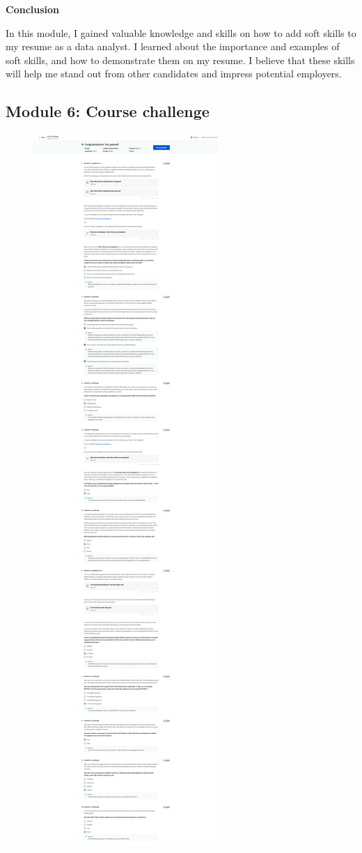 \documentclass[]{article}
\begin{document}
\textbf{Conclusion}

In this module, I gained valuable knowledge and skills on how to add soft skills to my resume as a data analyst. I learned about the importance and examples of soft skills, and how to demonstrate them on my resume. I believe that these skills will help me stand out from other candidates and impress potential employers.

\pagebreak

\subsection{Module 6: Course challenge}

\begin{figure}
  \centering
  \includegraphics[height=\textheight,keepaspectratio]{image/module_6.png}
\end{figure}
\end{document}
